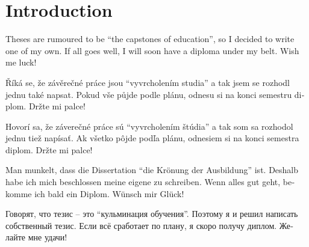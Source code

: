\documentclass[
  digital,     %
  oneside,     %
  nosansbold,  %
  nocolorbold, %
  lof,         %
  lot,         %
]{fithesis4}
\def\textrussian#1{{\usefont{T2A}{PTSerif-TLF}{m}{rm}#1}}
\begin{document}
\chapter*{Introduction}

Theses are rumoured to be \enquote{the capstones of education}, so
I decided to write one of my own. If all goes well, I will soon
have a diploma under my belt. Wish me luck!

\begin{otherlanguage}{czech}
Říká se, že závěrečné práce jsou \enquote{vyvrcholením studia}
a tak jsem se rozhodl jednu také napsat. Pokud vše půjde podle
plánu, odnesu si na konci semestru diplom. Držte mi palce!
\end{otherlanguage}

\begin{otherlanguage}{slovak}
Hovorí sa, že záverečné práce sú \enquote{vyvrcholením štúdia}
a tak som sa rozhodol jednu tiež napísať. Ak všetko pôjde podľa
plánu, odnesiem si na konci semestra diplom. Držte mi palce!
\end{otherlanguage}

\begin{otherlanguage}{german}
Man munkelt, dass die Dissertation \enquote{die Krönung der
Ausbildung} ist. Deshalb habe ich mich beschlossen meine eigene
zu schreiben. Wenn alles gut geht, bekomme ich bald ein Diplom.
Wünsch mir Glück!
\end{otherlanguage}

\begin{otherlanguage}{russian}\textrussian{%
Говорят, что тезис -- это \enquote{кульминация обучения}. Поэтому
я и решил написать собственный тезис. Если всё сработает по плану,
я скоро получу диплом. Желайте мне удачи!
}\end{otherlanguage}
\end{document}
